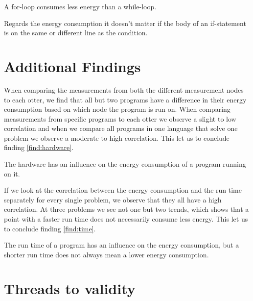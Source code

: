 \begin{finding}
	A for-loop consumes less energy than a while-loop.
	\label{find:loop}
\end{finding}

\begin{finding}
	Regards the energy consumption it doesn't matter if the body of an if-statement is on the same or different line as the condition.
	\label{find:if}
\end{finding}

\section{Additional Findings}
When comparing the measurements from both the different measurement nodes to each otter, we find that all but two programs have a difference in their energy consumption based on which node the program is run on. When comparing measurements from specific programs to each otter we observe a slight to low correlation and when we compare all programs in one language that solve one problem we observe a moderate to high correlation. This let us to conclude finding \ref{find:hardware}.\\

\begin{finding}
	The hardware has an influence on the energy consumption of a program running on it.
	\label{find:hardware}
\end{finding}

If we look at the correlation between the energy consumption and the run time separately for every single problem, we observe that they all have a high correlation. At three problems we see not one but two trends, which shows that a point with a faster run time does not necessarily consume less energy. This let us to conclude finding \ref{find:time}.\\

\begin{finding}
	The run time of a program has an influence on the energy consumption, but a shorter run time does not always mean a lower energy consumption. 
	\label{find:time}
\end{finding}


\section{Threads to validity}

